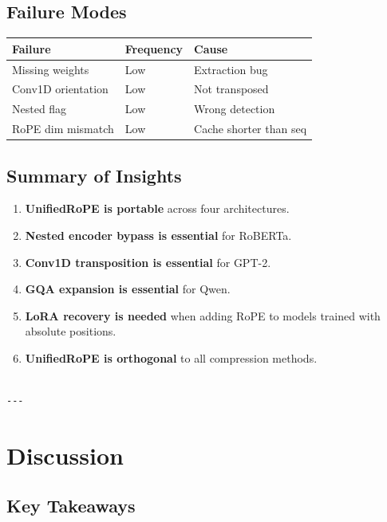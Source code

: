 {\subsection{Failure Modes}

\begin{table}[H]
\centering
\small
\begin{tabular}{lll}
\toprule
\textbf{Failure} & \textbf{Frequency} & \textbf{Cause} \\
\midrule
Missing weights & Low & Extraction bug \\
Conv1D orientation & Low & Not transposed \\
Nested flag & Low & Wrong detection \\
RoPE dim mismatch & Low & Cache shorter than seq \\
\bottomrule
\end{tabular}
\end{table}

\subsection{Summary of Insights}

\begin{enumerate}
\item \textbf{UnifiedRoPE is portable} across four architectures.
\item \textbf{Nested encoder bypass is essential} for RoBERTa.
\item \textbf{Conv1D transposition is essential} for GPT-2.
\item \textbf{GQA expansion is essential} for Qwen.
\item \textbf{LoRA recovery is needed} when adding RoPE to models trained with
  absolute positions.
\item \textbf{UnifiedRoPE is orthogonal} to all compression methods.
\end{enumerate}
\begin{lstlisting}

---
\end{lstlisting}


\section{Discussion}

\subsection{Key Takeaways}

}
